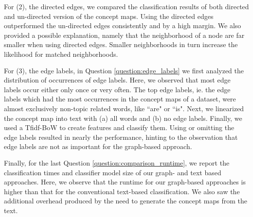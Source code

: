 For (2), the directed edges, we compared the classification results of both directed and un-directed version of the concept maps.
Using the directed edges outperformed the un-directed edges consistently and by a high margin.
We also provided a possible explanation, namely that the neighborhood of a node are far smaller when using directed edges.
Smaller neighborhoods in turn increase the likelihood for matched neighborhoods.

For (3), the edge labels, in Question \ref{question:edge_labels} we first analyzed the distribution of occurrences of edge labels. Here, we observed that most edge labels occur either only once or very often.
The top edge labels, ie. the edge labels which had the most occurrences in the concept maps of a dataset, were almost exclusively non-topic related words, like ``are" or ``is".
Next, we linearized the concept map into text with (a) all words and (b) no edge labels.
Finally, we used a Tfidf-BoW to create features and classify them.
Using or omitting the edge labels resulted in nearly the performance, hinting to the observation that edge labels are not as important for the graph-based approach.

Finally, for the last Question \ref{question:comparison_runtime}, we report the classification times and classifier model size of our graph- and text based approaches.
Here, we observe that the runtime for our graph-based approaches is higher than that for the conventional text-based classification.
We also saw the additional overhead produced by the need to generate the concept maps from the text.

